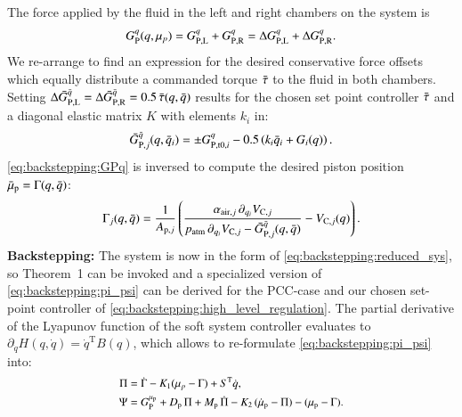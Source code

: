 The force applied by the fluid in the left and right chambers on the system is
\begin{equation}\small
    G_{\mathrm{P}}^q(q, \mu_p) =  G_{\mathrm{P},\mathrm{L}}^q + G_{\mathrm{P},\mathrm{R}}^q = \Delta G_{\mathrm{P},\mathrm{L}}^q + \Delta G_{\mathrm{P},\mathrm{R}}^q .
\end{equation}
We re-arrange to find an expression for the desired conservative force offsets which equally distribute a commanded torque $\Bar{\tau}$ to the fluid in both chambers. Setting
$\Delta \Bar{G}_{\mathrm{P},\mathrm{L}}^{\Bar{q}} =  \Delta \Bar{G}_{\mathrm{P},\mathrm{R}}^{\Bar{q}} = 0.5 \, \Bar{\tau}(q, \Bar{q})$
results for the chosen set point controller $\Bar{\tau}$ and a diagonal elastic matrix $K$ with elements $k_i$ in:
\begin{equation}\small\label{eq:backstepping:dist_G_p_q_planar_pcc}
    \Bar{G}_{\mathrm{P},j}^{\Bar{q}}(q, \Bar{q}_i) 
    = \pm G_{\mathrm{P},\mathrm{t}0,i}^{q} - 0.5 \left ( k_i \Bar{q}_i + G_i(q) \right ).
\end{equation}
\eqref{eq:backstepping:GPq} is inversed to compute the desired piston position $\Bar{\mu}_{\mathrm{p}} = \Gamma(q, \Bar{q})$:
\begin{equation}\small\label{eq:backstepping:gamma}
    \Gamma_j(q, \Bar{q}) = \frac{1}{A_{\mathrm{p},j}} \left ( \frac{\alpha_{\mathrm{air},j} \, \partial_{q_i} V_{\mathrm{C},j}}{p_\mathrm{atm} \, \partial_{q_i} V_{\mathrm{C},j} - \Bar{G}_{\mathrm{P},j}^{\Bar{q}}(q, \Bar{q})} - V_{\mathrm{C},j}(q) \right ).
\end{equation}
\textbf{Backstepping:}
The system is now in the form of \eqref{eq:backstepping:reduced_sys}, so Theorem~1 can be invoked and a specialized version of \eqref{eq:backstepping:pi_psi} can be derived for the \gls{PCC}-case and our chosen set-point controller of \eqref{eq:backstepping:high_level_regulation}. The partial derivative of the Lyapunov function of the soft system controller evaluates to $ \partial_{\dot{q}} H(q, \dot{q}) = \dot{q}^\mathrm{T} B(q)$, which allows to re-formulate \eqref{eq:backstepping:pi_psi} into:
\begin{equation}\small
\begin{split}
    \Pi &= \dot{\Gamma} - K_1 (\mu_p - \Gamma) + S^\mathrm{T} \dot{q},\\
    \Psi &= G_{\mathrm{P}}^{\mu_\mathrm{p}} + D_\mathrm{p} \, \Pi + M_\mathrm{p} \, \dot{\Pi} - K_2 \, (\dot{\mu}_\mathrm{p} - \Pi) - (\mu_\mathrm{p} - \Gamma).
\end{split}
\end{equation}

